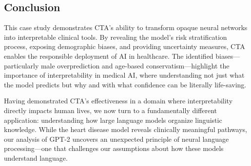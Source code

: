 \subsection{Conclusion}

This case study demonstrates CTA's ability to transform opaque neural networks into interpretable clinical tools. By revealing the model's risk stratification process, exposing demographic biases, and providing uncertainty measures, CTA enables the responsible deployment of AI in healthcare. The identified biases—particularly male overprediction and age-based conservatism—highlight the importance of interpretability in medical AI, where understanding not just what the model predicts but why and with what confidence can be literally life-saving.

Having demonstrated CTA's effectiveness in a domain where interpretability directly impacts human lives, we now turn to a fundamentally different application: understanding how large language models organize linguistic knowledge. While the heart disease model reveals clinically meaningful pathways, our analysis of GPT-2 uncovers an unexpected principle of neural language processing—one that challenges our assumptions about how these models understand language.